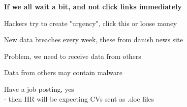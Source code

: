 \documentclass[Screen16to9,17pt,footrule]{foils}
\begin{document}
\vskip 1cm
\centerline{\Large\bf If we all wait a bit, and not click links immediately}

\vskip 1cm
Hackers try to create "urgency", click this or loose money



New data breaches every week, these from danish news site 

Problem, we need to receive data from others

Data from others may contain malware

Have a job posting, yes\\
- then HR will be expecting CVs sent as .doc files

\myquestionspage
\end{document}
